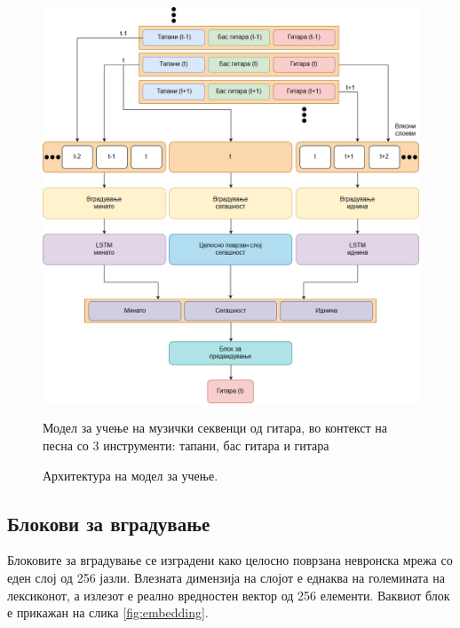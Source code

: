 \begin{figure}[H]
	\centering
    \includegraphics[scale=0.42]{images/arch.png}
	\caption{Архитектура на модел за учење.}
	Модел за учење на музички секвенци од гитара, во контекст на песна со 3 инструменти: тапани, бас гитара и гитара
	\label{fig:architecture}
\end{figure}


\subsection{Блокови за вградување}

Блоковите за вградување се изградени како целосно поврзана невронска мрежа со еден слој од 256 јазли. Влезната димензија на слојот е еднаква на големината на лексиконот, а излезот е реално вредностен вектор од 256 елементи. Ваквиот блок е прикажан на слика \ref{fig:embedding}.

